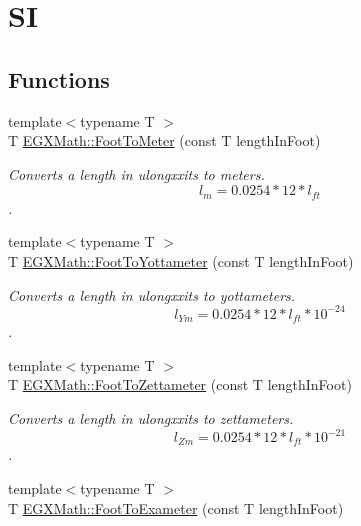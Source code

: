 \hypertarget{group___e_g_x_math-_conversions-_length_conversions-_imperial-_foot-_s_i}{}\section{SI}
\label{group___e_g_x_math-_conversions-_length_conversions-_imperial-_foot-_s_i}
\subsection*{Functions}
\begin{DoxyCompactItemize}
\item 
{\footnotesize template$<$typename T $>$ }\\T \mbox{\hyperlink{group___e_g_x_math-_conversions-_length_conversions-_imperial-_foot-_s_i_ga6b4c99ec398edb961655516d6e7ffd9b}{E\+G\+X\+Math\+::\+Foot\+To\+Meter}} (const T length\+In\+Foot)
\begin{DoxyCompactList}\small\item\em Converts a length in ulongxxits to meters. \[ l_{m}=0.0254 * 12 * l_{ft} \]. \end{DoxyCompactList}\item 
{\footnotesize template$<$typename T $>$ }\\T \mbox{\hyperlink{group___e_g_x_math-_conversions-_length_conversions-_imperial-_foot-_s_i_ga46034464c113e5d1689c0fd573c65977}{E\+G\+X\+Math\+::\+Foot\+To\+Yottameter}} (const T length\+In\+Foot)
\begin{DoxyCompactList}\small\item\em Converts a length in ulongxxits to yottameters. \[ l_{Ym}=0.0254 * 12 * l_{ft} * 10^{-24} \]. \end{DoxyCompactList}\item 
{\footnotesize template$<$typename T $>$ }\\T \mbox{\hyperlink{group___e_g_x_math-_conversions-_length_conversions-_imperial-_foot-_s_i_gab3fbbb8c19effbba293a76e2141b03be}{E\+G\+X\+Math\+::\+Foot\+To\+Zettameter}} (const T length\+In\+Foot)
\begin{DoxyCompactList}\small\item\em Converts a length in ulongxxits to zettameters. \[ l_{Zm}=0.0254 * 12 * l_{ft} * 10^{-21} \]. \end{DoxyCompactList}\item 
{\footnotesize template$<$typename T $>$ }\\T \mbox{\hyperlink{group___e_g_x_math-_conversions-_length_conversions-_imperial-_foot-_s_i_gaf2d43637b7f1ee964274c36ceeff93b2}{E\+G\+X\+Math\+::\+Foot\+To\+Exameter}} (const T length\+In\+Foot)

\end{DoxyCompactItemize}
